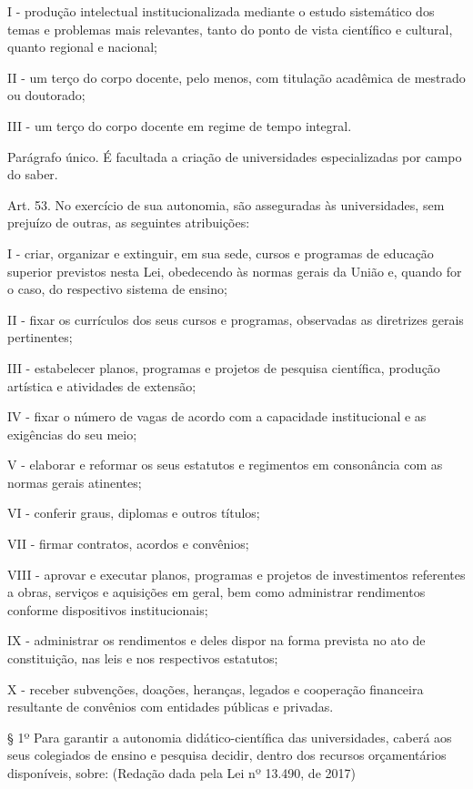 \documentclass[
]{book}
\begin{document}
I - produção intelectual institucionalizada mediante o estudo sistemático dos temas e problemas mais relevantes, tanto do ponto de vista científico e cultural, quanto regional e nacional;

II - um terço do corpo docente, pelo menos, com titulação acadêmica de mestrado ou doutorado;

III - um terço do corpo docente em regime de tempo integral.

Parágrafo único. É facultada a criação de universidades especializadas por campo do saber.

Art. 53. No exercício de sua autonomia, são asseguradas às universidades, sem prejuízo de outras, as seguintes atribuições:

I - criar, organizar e extinguir, em sua sede, cursos e programas de educação superior previstos nesta Lei, obedecendo às normas gerais da União e, quando for o caso, do respectivo sistema de ensino;

II - fixar os currículos dos seus cursos e programas, observadas as diretrizes gerais pertinentes;

III - estabelecer planos, programas e projetos de pesquisa científica, produção artística e atividades de extensão;

IV - fixar o número de vagas de acordo com a capacidade institucional e as exigências do seu meio;

V - elaborar e reformar os seus estatutos e regimentos em consonância com as normas gerais atinentes;

VI - conferir graus, diplomas e outros títulos;

VII - firmar contratos, acordos e convênios;

VIII - aprovar e executar planos, programas e projetos de investimentos referentes a obras, serviços e aquisições em geral, bem como administrar rendimentos conforme dispositivos institucionais;

IX - administrar os rendimentos e deles dispor na forma prevista no ato de constituição, nas leis e nos respectivos estatutos;

X - receber subvenções, doações, heranças, legados e cooperação financeira resultante de convênios com entidades públicas e privadas.

§ 1º Para garantir a autonomia didático-científica das universidades, caberá aos seus colegiados de ensino e pesquisa decidir, dentro dos recursos orçamentários disponíveis, sobre: (Redação dada pela Lei nº 13.490, de 2017)
\end{document}
